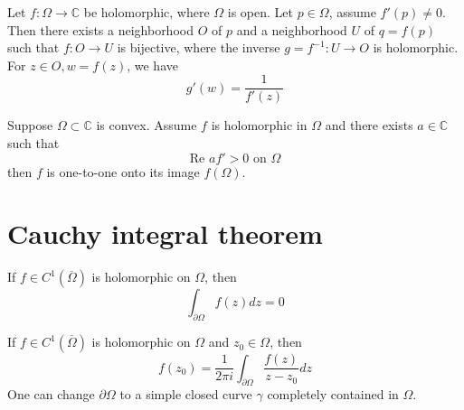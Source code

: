 \documentclass[openany]{book}
\newcommand{\R}{\mathbb{R}}
\newcommand{\C}{\mathbb{C}}
\begin{document}


\begin{prop}
    Let $f:\Omega\to\C$ be holomorphic, where $\Omega$ is open. Let $p\in\Omega$, assume $f'(p)\neq 0$. Then there exists a neighborhood $O$ of $p$ and a neighborhood $U$ of $q=f(p)$ such that $f:O\to U$ is bijective, where the inverse $g=f^{-1}: U\to O$ is holomorphic. For $z\in O, w=f(z)$, we have 
    \begin{equation*}
        g'(w)=\frac{1}{f'(z)}
    \end{equation*}
\end{prop}


\begin{prop}
    Suppose $\Omega\subset\C$ is convex. Assume $f$ is holomorphic in $\Omega$ and there exists $a\in\C$ such that 
    \begin{equation*}
        \text{Re } af'>0 \text{ on } \Omega
    \end{equation*}
    then $f$ is one-to-one onto its image $f(\Omega)$.
\end{prop}




\chapter{Cauchy integral theorem}

\begin{thm}
    If $f\in C^1(\overline{\Omega})$ is holomorphic on $\Omega$, then 
    \begin{equation*}
        \int_{\partial\Omega}f(z)dz=0
    \end{equation*}
\end{thm}

\begin{thm}
    If $f\in C^1(\overline{\Omega})$ is holomorphic on $\Omega$ and $z_0\in\Omega$, then 
    \begin{equation*}
        f(z_0)=\frac{1}{2\pi i}\int_{\partial\Omega}\frac{f(z)}{z-z_0}dz
    \end{equation*}
    One can change $\partial\Omega$ to a simple closed curve $\gamma$ completely contained in $\Omega$.
\end{thm}
\end{document}
